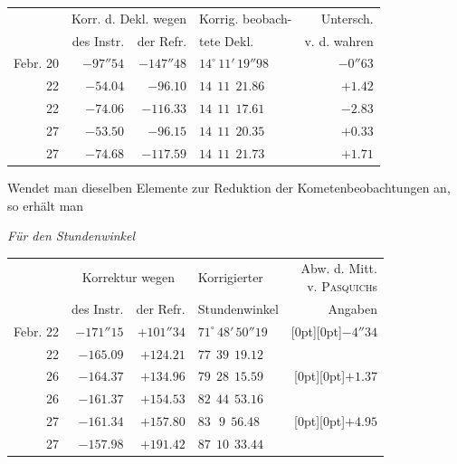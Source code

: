 \begin{center}\footnotesize\setlength{\tabcolsep}{4pt}
\begin{tabular}{r|r|r|l|r}
 & \multicolumn{2}{c|}{Korr. d. Dekl. wegen} & Korrig. beobach- & Untersch.\\
 & des Instr. & der Refr. & tete Dekl. & v. d. wahren \\
\hline
Febr. 20 & $-97''54$ & $-147''48$ & $14^\circ\,11'\,19''98$ & $-0''63$ \\
22 & $-54.04$ & $-96.10$ & $14\ \ 11\ \ 21.86$ & $+1.42$ \\
22 & $-74.06$ & $-116.33$ & $14\ \ 11\ \ 17.61$ & $-2.83$ \\
27 & $-53.50$ & $-96.15$ & $14\ \ 11\ \ 20.35$ & $+0.33$ \\
27 & $-74.68$ & $-117.59$ & $14\ \ 11\ \ 21.73$ & $+1.71$ \\
\end{tabular}
\end{center}

Wendet man dieselben Elemente zur Reduktion der Kometenbeobachtungen an, so erhält
man

\begin{center}\footnotesize\setlength{\tabcolsep}{4pt}
\emph{Für den Stundenwinkel}
\end{center}

\begin{center}\footnotesize\setlength{\tabcolsep}{4pt}
\begin{tabular}{r|r|r|l|r}
 & \multicolumn{2}{c|}{Korrektur wegen} & Korrigierter & \shortstack{Abw. d. Mitt.\\v. \textsc{Pasquich}s}\\
 & des Instr. & der Refr. & Stundenwinkel & Angaben \\
\hline
Febr. 22 & $-171''15$ & $+101''34$ & $71^\circ\,48'\,50''19$ & \raisebox{-5.5pt}[0pt][0pt]{$-4''34$} \\
22 & $-165.09$ & $+124.21$ & $77\ \ 39\ \ 19.12$ & \\
26 & $-164.37$ & $+134.96$ & $79\ \ 28\ \ 15.59$ & \raisebox{-5.5pt}[0pt][0pt]{$+1.37$} \\
26 & $-161.37$ & $+154.53$ & $82\ \ 44\ \ 53.16$ & \\
27 & $-161.34$ & $+157.80$ & $83\ \ \ 9\ \ 56.48$ & \raisebox{-5.5pt}[0pt][0pt]{$+4.95$} \\
27 & $-157.98$ & $+191.42$ & $87\ \ 10\ \ 33.44$ & \\
\end{tabular}
\end{center}


